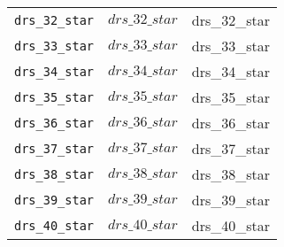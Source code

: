 \begin{center}
\begin{longtable}{ccc}
\texttt{drs\_32\_star} & $drs\_32\_star$ & drs\_32\_star\\
\texttt{drs\_33\_star} & $drs\_33\_star$ & drs\_33\_star\\
\texttt{drs\_34\_star} & $drs\_34\_star$ & drs\_34\_star\\
\texttt{drs\_35\_star} & $drs\_35\_star$ & drs\_35\_star\\
\texttt{drs\_36\_star} & $drs\_36\_star$ & drs\_36\_star\\
\texttt{drs\_37\_star} & $drs\_37\_star$ & drs\_37\_star\\
\texttt{drs\_38\_star} & $drs\_38\_star$ & drs\_38\_star\\
\texttt{drs\_39\_star} & $drs\_39\_star$ & drs\_39\_star\\
\texttt{drs\_40\_star} & $drs\_40\_star$ & drs\_40\_star\\
\hline%
\end{longtable}
\end{center}
